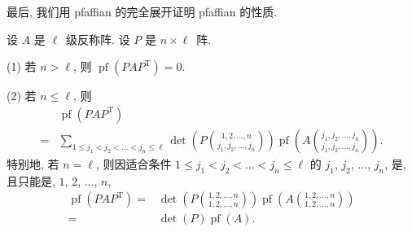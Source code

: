 \documentclass[../libro]{subfiles}
\begin{document}
最后, 我们用 pfaffian 的完全展开证明 pfaffian 的性质.

\clearpage

\begin{theorem}
    设 \(A\) 是 \(\ell\)~级反称阵.
    设 \(P\) 是 \(n \times \ell\)~阵.

    (1)
    若 \(n > \ell\),
    则 \(\operatorname{pf} {(P A P^{\mathrm{T}})} = 0\).

    (2)
    若 \(n \leq \ell\),
    则
    \begin{align*}
             &
        \operatorname{pf} {(P A P^{\mathrm{T}})}
        \\
        = {} &
        \sum_{1 \leq j_1 < j_2 < \dots < j_{n} \leq \ell}
        {\det {\left(
                P\binom{1,2,\dots,n}{j_1,j_2,\dots,j_{n}}
                \right)}
            \operatorname{pf} {\left(
                A\binom{j_1,j_2,\dots,j_{n}}{j_1,j_2,\dots,j_{n}}
                \right)}}.
    \end{align*}
    特别地, 若 \(n = \ell\),
    则因适合条件
    \(1 \leq j_1 < j_2 < \dots < j_{n} \leq \ell\)
    的
    \(j_1\), \(j_2\), \(\dots\), \(j_{n}\),
    是, 且只能是,
    \(1\), \(2\), \(\dots\), \(n\),
    \begin{align*}
        \operatorname{pf} {(P A P^{\mathrm{T}})}
        = {} &
        \det {\left(
            P\binom{1,2,\dots,n}{1,2,\dots,n}
            \right)}
        \operatorname{pf} {\left(
            A\binom{1,2,\dots,n}{1,2,\dots,n}
            \right)}
        \\
        = {} &
        \det {(P)} \operatorname{pf} {(A)}.
    \end{align*}
\end{theorem}
\end{document}
